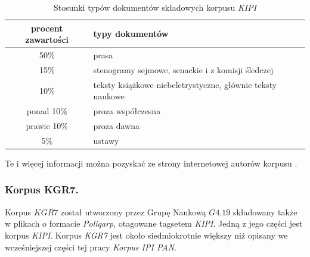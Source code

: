 \documentclass[11pt,a4paper]{llncs}
\begin{document}
\begin{table}[h!]
\centering
\begin{tabular}{ c | l }
	\toprule
	procent zawartości & typy dokumentów \\
	\midrule
	50\% & prasa \\
	15\% & stenogramy sejmowe, senackie i z komisji śledczej \\
	10\% & teksty książkowe niebeletrystyczne, głównie teksty naukowe \\
	ponad 10\% & proza współczesna \\
	prawie 10\%  & proza dawna \\
	5\% & ustawy \\
	\bottomrule
\end{tabular}
\caption[Składowe korpus \emph{KIPI}]{Stosunki typów dokumentów składowych korpusu \emph{KIPI}}
\label{kipi_stats}
\end{table}

Te i więcej informacji można pozyskać ze strony internetowej autorów korpusu \cite{kipi}.

\subsubsection{Korpus KGR7.}

Korpus $KGR7$ został utworzony przez Grupę Naukową $G4.19$ składowany także w plikach o formacie \emph{Poliqarp}, otagowane tagsetem \emph{KIPI}.
Jedną z jego części jest korpus \emph{KIPI}.
Korpus \emph{KGR7} jest około siedmiokrotnie większy niż opisany we wcześniejszej części tej pracy \emph{Korpus IPI PAN}.
\end{document}
